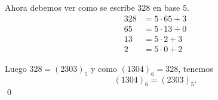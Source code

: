 \documentclass[handout]{beamer} %
\begin{document}
\begin{frame}

Ahora debemos ver como se escribe $328$  en base $5$.
\begin{align*}
328 &= 5 \cdot 65   + 3\\ 
65 &= 5 \cdot 13   + 0\\ 
13 &= 5 \cdot 2   + 3\\ 
2 &= 5 \cdot 0   + 2
\end{align*}

Luego  $328 = (2303)_5$ y como $(1304)_6 = 328$, tenemos  
$$(1304)_6 = (2303)_5.$$ \qed

\vskip 3cm
\end{frame}
\end{document}
